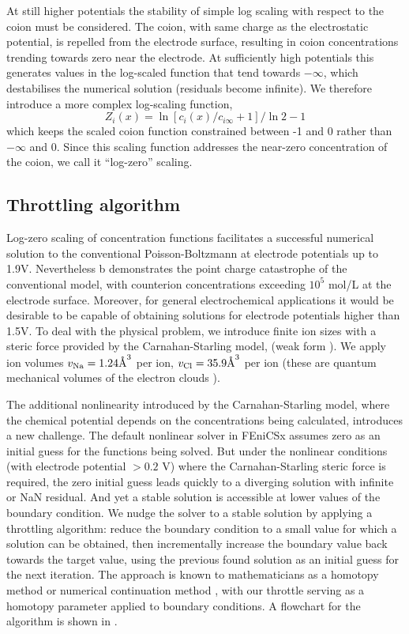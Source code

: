At still higher potentials the stability of simple log scaling with
respect to the coion must be considered. The coion, with same charge
as the electrostatic potential, is repelled from the electrode surface,
resulting in coion concentrations trending towards zero near the electrode. At
sufficiently high potentials this generates values in the log-scaled
function that tend towards $-\infty$, which destabilises the numerical
solution (residuals become infinite). We therefore introduce a more complex log-scaling function,
\begin{equation}
Z_i(x) = \ln\left[c_i(x)/c_{i\infty}+1\right]/\ln 2 - 1
\label{log_zero}
\end{equation}
which keeps the scaled coion function constrained between -1 and 0
rather than $-\infty$ and 0. Since this scaling function addresses the
near-zero concentration of the coion, we call it ``log-zero'' scaling.

\subsection{Throttling algorithm}

Log-zero scaling of concentration functions facilitates a successful numerical solution to
the conventional Poisson-Boltzmann at electrode potentials
up to 1.9V. Nevertheless b demonstrates the
point charge catastrophe of the conventional model, with counterion
concentrations exceeding $10^{5}$ mol/L at the electrode
surface. Moreover, for general electrochemical applications it would
be desirable to be capable of obtaining solutions for electrode
potentials higher than 1.5V. To deal with the physical problem, we
introduce finite ion sizes with a steric force provided by the
Carnahan-Starling model,  (weak form
).  We apply ion volumes
$v_{\ce{Na}}=1.24 \textrm{\AA}^{3}$ per  ion,
$v_{\ce{Cl}}=35.9 \textrm{\AA}^{3}$ per  ion (these are
quantum mechanical volumes of the electron clouds \citep{ParsonsNinham2009}).

The additional nonlinearity introduced by the Carnahan-Starling model,
where the chemical potential depends on the concentrations being
calculated, introduces a new challenge. The default nonlinear solver
in FEniCSx assumes zero as an initial guess for the functions being
solved. But under the nonlinear conditions (with electrode potential
$>0.2$ V) where the Carnahan-Starling steric force is required, the
zero initial guess leads quickly to a diverging solution with infinite
or NaN
residual. And yet a stable solution is accessible at lower values of
the boundary condition. We nudge the solver to a stable solution by
applying a throttling algorithm: reduce the boundary condition to a
small value for which a solution can be obtained, then incrementally
increase the boundary value back towards the target value, using the
previous found solution as an initial guess for the next
iteration. The approach is known to mathematicians as a homotopy
method \citep{homotopy_analysis_Liao2012}
or numerical continuation method \citep{allgower1990numerical},
with our throttle serving as a homotopy parameter applied to boundary
conditions.  A flowchart for the algorithm is shown in
.

